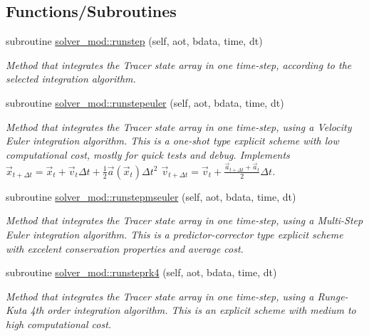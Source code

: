 \subsection*{Functions/\+Subroutines}
\begin{DoxyCompactItemize}
\item 
subroutine \mbox{\hyperlink{namespacesolver__mod_ab87d71c6c8aa1709901ec14f9bf12505}{solver\+\_\+mod\+::runstep}} (self, aot, bdata, time, dt)
\begin{DoxyCompactList}\small\item\em Method that integrates the Tracer state array in one time-\/step, according to the selected integration algorithm. \end{DoxyCompactList}\item 
subroutine \mbox{\hyperlink{namespacesolver__mod_a1c6bb2899a5ce28d6b63f1d0e67d2b92}{solver\+\_\+mod\+::runstepeuler}} (self, aot, bdata, time, dt)
\begin{DoxyCompactList}\small\item\em Method that integrates the Tracer state array in one time-\/step, using a Velocity Euler integration algorithm. This is a one-\/shot type explicit scheme with low computational cost, mostly for quick tests and debug. Implements $ {\vec {x}}_{t+\Delta t}={\vec {x}}_{t}+{\vec {v}}_{t}\Delta t+{\frac {1}{2}}{\vec {a}}({\vec {x}}_{t})\Delta t^{2}$ $ {\vec {v}}_{t+\Delta t}={\vec {v}}_{t}+\frac{{\vec {a}}_{t+\Delta t}+{\vec {a}}_{t}}{2}\Delta t$. \end{DoxyCompactList}\item 
subroutine \mbox{\hyperlink{namespacesolver__mod_a799bf8b0b57a431b29c8dbeef9be6e48}{solver\+\_\+mod\+::runstepmseuler}} (self, aot, bdata, time, dt)
\begin{DoxyCompactList}\small\item\em Method that integrates the Tracer state array in one time-\/step, using a Multi-\/\+Step Euler integration algorithm. This is a predictor-\/corrector type explicit scheme with excelent conservation properties and average cost. \end{DoxyCompactList}\item 
subroutine \mbox{\hyperlink{namespacesolver__mod_ae59da54f053ae369d76f130b3790f3b7}{solver\+\_\+mod\+::runsteprk4}} (self, aot, bdata, time, dt)
\begin{DoxyCompactList}\small\item\em Method that integrates the Tracer state array in one time-\/step, using a Runge-\/\+Kuta 4th order integration algorithm. This is an explicit scheme with medium to high computational cost. \end{DoxyCompactList}\item 

\end{DoxyCompactItemize}
